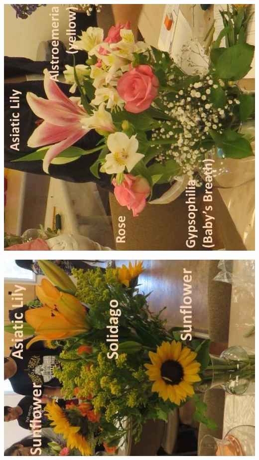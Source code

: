 \documentclass{article}
\begin{document}
\begin{center}
\includegraphics[height=0.925\paperheight]{../Arrangement2.jpg}
\end{center}
\newpage

\begin{center}
\includegraphics[height=0.925\paperheight]{../Arrangement4.jpg}
\end{center}
\newpage
\end{document}
